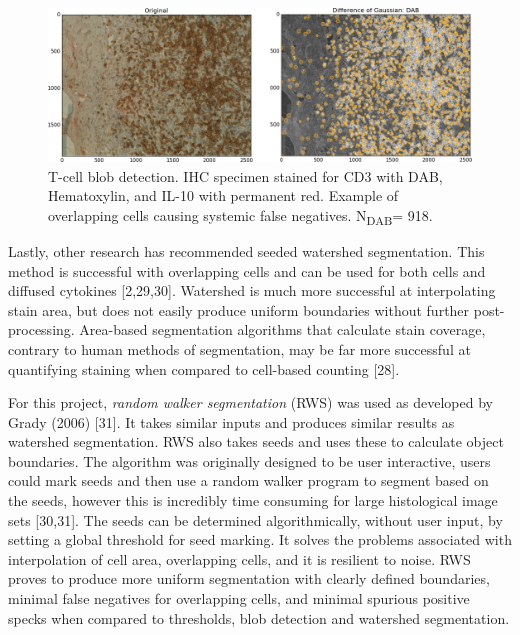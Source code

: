 \documentclass[12pt]{article}
\begin{document}
\begin{figure}[H]
  \includegraphics[width=\linewidth]{BlobDetectHard4.png}
  \caption{T-cell blob detection. IHC specimen stained for CD3 with DAB, Hematoxylin, and IL-10 with permanent red.  Example of overlapping cells causing systemic false negatives. N\textsubscript{DAB}= 918.}
  \label{fig:BlobDetectHard4}
\end{figure}


Lastly, other research has recommended seeded watershed segmentation. This method is successful with overlapping cells and can be used for both cells and diffused cytokines [2,29,30]. Watershed is much more successful at interpolating stain area, but does not easily produce uniform boundaries without further post-processing. Area-based segmentation algorithms that calculate stain coverage, contrary to human methods of segmentation, may be far more successful at quantifying staining when compared to cell-based counting [28].
	
For this project, \textit{random walker segmentation} (RWS) was used as developed by Grady (2006) [31]. It takes similar inputs and produces similar results as watershed segmentation. RWS also takes seeds and uses these to calculate object boundaries. The algorithm was originally designed to be user interactive, users could mark seeds and then use a random walker program to segment based on the seeds, however this is incredibly time consuming for large histological image sets [30,31]. The seeds can be determined algorithmically, without user input, by setting a global threshold for seed marking. It solves the problems associated with interpolation of cell area, overlapping cells, and it is resilient to noise. RWS proves to produce more uniform segmentation with clearly defined boundaries, minimal false negatives for overlapping cells, and minimal spurious positive specks when compared to thresholds, blob detection and watershed segmentation.
\end{document}
